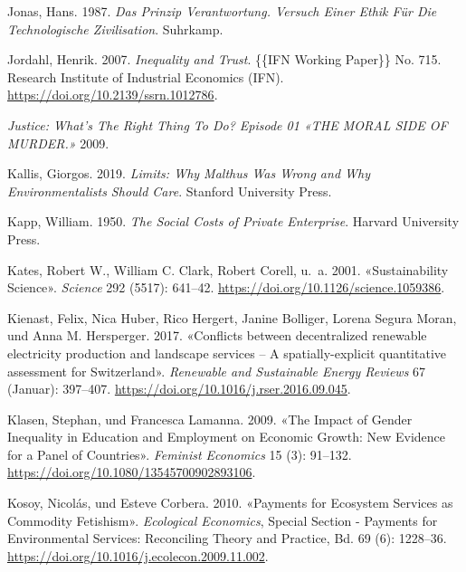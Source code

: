 \documentclass[
  nswissgerman,
  a4paper,
  openany]{book}
\newlength{\cslhangindent}
\newenvironment{CSLReferences}[2] %
 {\begin{list}{}{%
  \setlength{\itemindent}{0pt}
  \setlength{\leftmargin}{0pt}
  \setlength{\parsep}{0pt}
  \ifodd #1
   \setlength{\leftmargin}{\cslhangindent}
   \setlength{\itemindent}{-1\cslhangindent}
  \fi
  \setlength{\itemsep}{#2\baselineskip}}}
 {\end{list}}
\begin{document}
\begin{CSLReferences}{1}{1}
Jonas, Hans. 1987. \emph{Das {Prinzip Verantwortung}. {Versuch} Einer
{Ethik} F{ü}r Die Technologische {Zivilisation}}. Suhrkamp.

Jordahl, Henrik. 2007. \emph{Inequality and {Trust}}. \{\{IFN Working
Paper\}\} No. 715. Research Institute of Industrial Economics (IFN).
\url{https://doi.org/10.2139/ssrn.1012786}.

\emph{Justice: {What}'s {The Right Thing To Do}? {Episode} 01 {«{THE
MORAL SIDE OF MURDER}.»}} 2009.

Kallis, Giorgos. 2019. \emph{Limits: {Why Malthus Was Wrong} and {Why
Environmentalists Should Care}}. Stanford University Press.

Kapp, William. 1950. \emph{The {Social Costs} of {Private Enterprise}}.
Harvard University Press.

Kates, Robert W., William C. Clark, Robert Corell, u.~a. 2001.
{«Sustainability {Science}»}. \emph{Science} 292 (5517): 641--42.
\url{https://doi.org/10.1126/science.1059386}.

Kienast, Felix, Nica Huber, Rico Hergert, Janine Bolliger, Lorena Segura
Moran, und Anna M. Hersperger. 2017. {«Conflicts between decentralized
renewable electricity production and landscape services -- {A}
spatially-explicit quantitative assessment for {Switzerland}»}.
\emph{Renewable and Sustainable Energy Reviews} 67 (Januar): 397--407.
\url{https://doi.org/10.1016/j.rser.2016.09.045}.

Klasen, Stephan, und Francesca Lamanna. 2009. {«The {Impact} of {Gender
Inequality} in {Education} and {Employment} on {Economic Growth}: {New
Evidence} for a {Panel} of {Countries}»}. \emph{Feminist Economics} 15
(3): 91--132. \url{https://doi.org/10.1080/13545700902893106}.

Kosoy, Nicolás, und Esteve Corbera. 2010. {«Payments for Ecosystem
Services as Commodity Fetishism»}. \emph{Ecological Economics}, Special
{Section} - {Payments} for {Environmental Services}: {Reconciling
Theory} and {Practice}, Bd. 69 (6): 1228--36.
\url{https://doi.org/10.1016/j.ecolecon.2009.11.002}.


\end{CSLReferences}
\end{document}
